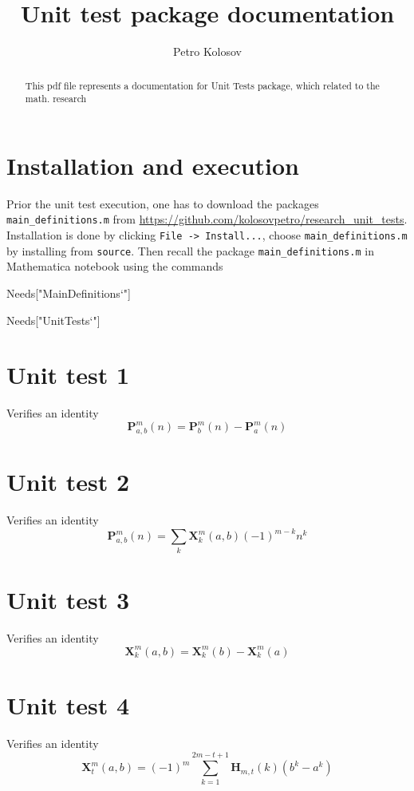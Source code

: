 \documentclass[12pt, letterpaper]{amsart}
\author[Petro Kolosov]{Petro Kolosov}
\title{Unit test package documentation}
\theoremstyle{definition}
\theoremstyle{remark}
\numberwithin{equation}{section}
\begin{document}
\begin{abstract}
This pdf file represents a documentation for Unit Tests package, which related to the math. research
\end{abstract}
\maketitle
\tableofcontents
\section{Installation and execution}
Prior the unit test execution, one has to download the packages \verb"main_definitions.m" from \href{https://github.com/KolosovPetro/research_unit_tests}{\textsf{https://github.com/kolosovpetro/research\_unit\_tests}}. Installation is done by clicking \verb"File -> Install...", choose \verb"main_definitions.m" by installing from \verb"source".  Then recall the package \verb"main_definitions.m" in Mathematica notebook using the commands 
\begin{center}
\textsf{Needs["MainDefinitions`"]}
\end{center}
\begin{center}
\textsf{Needs["UnitTests`"]}
\end{center}
\section{Unit test 1}
Verifies an identity 
\begin{equation*}
\mathbf{P}^{m}_{a,b}(n) = \mathbf{P}^{m}_{b}(n)-\mathbf{P}^{m}_{a}(n)
\end{equation*}
\section{Unit test 2}
Verifies an identity
\begin{equation*}
\mathbf{P}^{m}_{a,b}(n) = \sum_{k}\mathbf{X}^{m}_{k}(a,b) (-1)^{m-k} n^k
\end{equation*}
\section{Unit test 3}
Verifies an identity
\begin{equation*}
\mathbf{X}^{m}_{k}(a,b)=\mathbf{X}^{m}_{k}(b) - \mathbf{X}^{m}_{k}(a)
\end{equation*}
\section{Unit test 4}
Verifies an identity
\begin{equation*}
\mathbf{X}^{m}_{t}(a,b) = (-1)^m \sum_{k=1}^{2 m - t + 1}\mathbf{H}_{m,t}(k) (b^k - a^k)
\end{equation*}
\end{document}
